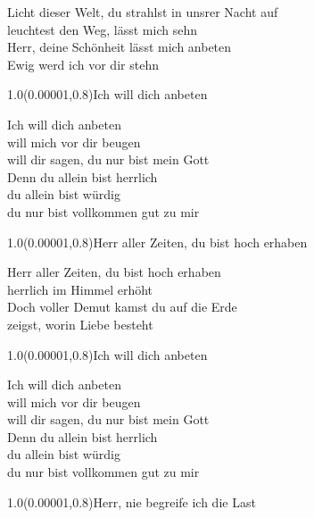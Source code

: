 \documentclass[aspectratio=169]{beamer}
\begin{document}
\color{white}
\begin{frame}
\centering
\color{white}
\huge{Licht dieser Welt, du strahlst in unsrer Nacht auf} \\
\huge{leuchtest den Weg, lässt mich sehn} \\
\huge{Herr, deine Schönheit lässt mich anbeten} \\
\huge{Ewig werd ich vor dir stehn} \\

\begin{textblock}{1.0}(0.00001,0.8)\color{gray}\normalsize{Ich will dich anbeten}\end{textblock}
\end{frame}

\begin{frame}
\centering
\color{white}
\huge{Ich will dich anbeten} \\
\huge{will mich vor dir beugen} \\
\huge{will dir sagen, du nur bist mein Gott} \\
\huge{Denn du allein bist herrlich} \\
\huge{du allein bist würdig} \\
\huge{du nur bist vollkommen gut zu mir} \\

\begin{textblock}{1.0}(0.00001,0.8)\color{gray}\normalsize{Herr aller Zeiten, du bist hoch erhaben}\end{textblock}
\end{frame}

\begin{frame}
\centering
\color{white}
\huge{Herr aller Zeiten, du bist hoch erhaben} \\
\huge{herrlich im Himmel erhöht} \\
\huge{Doch voller Demut kamst du auf die Erde} \\
\huge{zeigst, worin Liebe besteht} \\

\begin{textblock}{1.0}(0.00001,0.8)\color{gray}\normalsize{Ich will dich anbeten}\end{textblock}
\end{frame}

\begin{frame}
\centering
\color{white}
\huge{Ich will dich anbeten} \\
\huge{will mich vor dir beugen} \\
\huge{will dir sagen, du nur bist mein Gott} \\
\huge{Denn du allein bist herrlich} \\
\huge{du allein bist würdig} \\
\huge{du nur bist vollkommen gut zu mir} \\

\begin{textblock}{1.0}(0.00001,0.8)\color{gray}\normalsize{Herr, nie begreife ich die Last}\end{textblock}
\end{frame}
\end{document}
